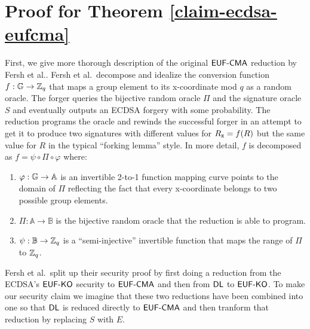 
\section{ Proof for Theorem \ref{claim-ecdsa-eufcma}}
\label{proof-ecdsa-eufcma}
\newcommand{\psidomain}{\mathbb{B}}
\newcommand{\phirange}{\mathbb{A}}
\newcommand{\Sdleq}{\mathcal{S}_{\DLEQ}}
\newcommand{\B}{\mathcal{B}}

First, we give more thorough description of the original $\textsf{EUF-CMA}$ reduction by Fersh et al.\cite{ecdsa-eufcma}.
Fersh et al.\ decompose and idealize the conversion function $f:\mathbb{G} \rightarrow \mathbb{Z}_q$ that maps a group element to its x-coordinate mod $q$ as a random oracle.
The forger queries the bijective random oracle $\Pi$ and the signature oracle $S$ and eventually outputs an ECDSA forgery with some probability.
The reduction programs the oracle and rewinds the successful forger in an attempt to get it to produce two signatures with different values for $R_{\mathtt{x}} = f(R)$ but the same value for $R$ in the typical ``forking lemma'' style\cite{pointcheval2000security}.
In more detail, $f$ is decomposed as $f = \psi \circ \Pi \circ \varphi$ where:

\begin{enumerate}
    \item $\varphi: \G \rightarrow \phirange$ is an invertible 2-to-1 function mapping curve points to the domain of $\Pi$ reflecting the fact that every x-coordinate belongs to two possible group elements.
    \item $\Pi: \phirange \rightarrow \psidomain$ is the bijective random oracle that the reduction is able to program.
    \item $\psi: \psidomain \rightarrow \ZZ_q$ is a ``semi-injective'' invertible function that maps the range of $\Pi$ to $\mathbb{Z}_q$.
\end{enumerate}

Fersh et al.\ split up their security proof by first doing a reduction from the ECDSA's $\textsf{EUF-KO}$ security to $\textsf{EUF-CMA}$ and then from $\textsf{DL}$ to $\textsf{EUF-KO}$.
To make our security claim we imagine that these two reductions have been combined into one so that $\textsf{DL}$ is reduced directly to $\textsf{EUF-CMA}$ and then tranform that reduction by replacing $S$ with $E$.


